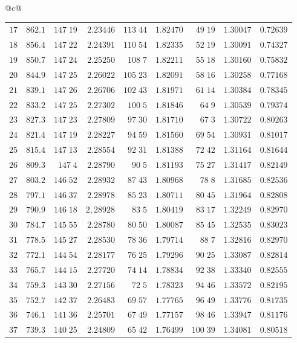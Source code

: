 \begin{center}
{\begin{tabular}{@{}c@{}}
\begin{tabular}{r|r|r|r|r|r|r|r|r}
$17$&$862.1$&$147\;19$&$2.23446$&$113\;44$&$1.82470$&$49\;19$&$1.30047$&$0.72639$\\
$18$&$856.4$&$147\;22$&$2.24391$&$110\;54$&$1.82335$&$52\;19$&$1.30091$&$0.74327$\\
$19$&$850.7$&$147\;24$&$2.25250$&$108\;7$&$1.82211$&$55\;18$&$1.30160$&$0.75832$\\[2pt]
$20$&$844.9$&$147\;25$&$2.26022$&$105\;23$&$1.82091$&$58\;16$&$1.30258$&$0.77168$\\
$21$&$839.1$&$147\;26$&$2.26706$&$102\;43$&$1.81971$&$61\;14$&$1.30384$&$0.78345$\\
$22$&$833.2$&$147\;25$&$2.27302$&$100\;5$&$1.81846$&$64\;9$&$1.30539$&$0.79374$\\
$23$&$827.3$&$147\;23$&$2.27809$&$97\;30$&$1.81710$&$67\;3$&$1.30722$&$0.80263$\\
$24$&$821.4$&$147\;19$&$2.28227$&$94\;59$&$1.81560$&$69\;54$&$1.30931$&$0.81017$\\[2pt]
$25$&$815.4$&$147\;13$&$2.28554$&$92\;31$&$1.81388$&$72\;42$&$1.31164$&$0.81644$\\
$26$&$809.3$&$147\;4$&$2.28790$&$90\;5$&$1.81193$&$75\;27$&$1.31417$&$0.82149$\\
$27$&$803.2$&$146\;52$&$2.28932$&$87\;43$&$1.80968$&$78\;8$&$1.31685$&$0.82536$\\
$28$&$797.1$&$146\;37$&$2.28978$&$85\;23$&$1.80711$&$80\;45$&$1.31964$&$0.82808$\\
$29$&$790.9$&$146\;18$&$2,28928$&$83\;5$&$1.80419$&$83\;17$&$1.32249$&$0.82970$\\[2pt]
$30$&$784.7$&$145\;55$&$2.28780$&$80\;50$&$1.80087$&$85\;45$&$1.32535$&$0.83023$\\
$31$&$778.5$&$145\;27$&$2.28530$&$78\;36$&$1.79714$&$88\;7$&$1.32816$&$0.82970$\\
$32$&$772.1$&$144\;54$&$2.28177$&$76\;25$&$1.79296$&$90\;25$&$1.33087$&$0.82814$\\
$33$&$765.7$&$144\;15$&$2.27720$&$74\;14$&$1.78834$&$92\;38$&$1.33340$&$0.82555$\\
$34$&$759.3$&$143\;30$&$2.27156$&$72\;5$&$1.78323$&$94\;46$&$1.33572$&$0.82195$\\[2pt]
$35$&$752.7$&$142\;37$&$2.26483$&$69\;57$&$1.77765$&$96\;49$&$1.33776$&$0.81735$\\
$36$&$746.1$&$141\;36$&$2.25701$&$67\;49$&$1.77157$&$98\;46$&$1.33947$&$0.81176$\\
$37$&$739.3$&$140\;25$&$2.24809$&$65\;42$&$1.76499$&$100\;39$&$1.34081$&$0.80518$\\

\end{tabular}
\end{tabular}}
\end{center}
